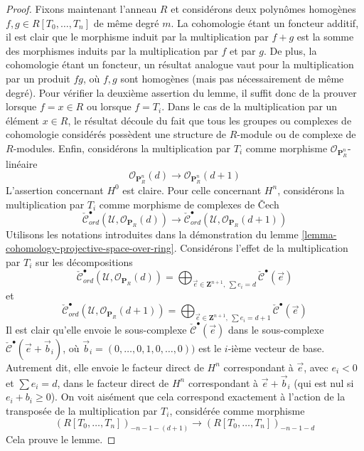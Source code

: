 \begin{proof}
\medskip\noindent
Fixons maintenant l'anneau $R$ et considérons deux polynômes homogènes
$f, g \in R[T_0, \ldots, T_n]$ de même degré $m$.
La cohomologie étant un foncteur additif, il est clair que le morphisme
induit par la multiplication par $f + g$ est la somme des morphismes
induits par la multiplication par $f$ et
par $g$. De plus, la cohomologie étant un foncteur,
un résultat analogue vaut pour la multiplication par un produit $fg$, où
$f, g$ sont homogènes (mais pas nécessairement de même degré). Pour
vérifier la deuxième assertion du lemme, il suffit donc de
la prouver lorsque $f = x \in R$ ou lorsque $f = T_i$.
Dans le cas de la multiplication par un élément $x \in R$, le
résultat découle du fait que tous les groupes ou complexes de cohomologie considérés
possèdent une structure de $R$-module ou de complexe de $R$-modules.
Enfin, considérons la multiplication par $T_i$
comme morphisme $\mathcal{O}_{\mathbf{P}^n_R}$-linéaire
$$
\mathcal{O}_{\mathbf{P}^n_R}(d)
\longrightarrow
\mathcal{O}_{\mathbf{P}^n_R}(d + 1)
$$
L'assertion concernant $H^0$ est claire. Pour celle concernant $H^n$,
considérons la multiplication par $T_i$ comme morphisme de complexes de {\v C}ech
$$
\check{\mathcal{C}}_{ord}^\bullet(\mathcal{U},
\mathcal{O}_{\mathbf{P}_R}(d))
\longrightarrow
\check{\mathcal{C}}_{ord}^\bullet(\mathcal{U},
\mathcal{O}_{\mathbf{P}_R}(d + 1))
$$
Utilisons les notations introduites dans la démonstration du
lemme \ref{lemma-cohomology-projective-space-over-ring}.
Considérons l'effet de la multiplication par $T_i$
sur les décompositions
$$
\check{\mathcal{C}}_{ord}^\bullet(\mathcal{U}, \mathcal{O}_{\mathbf{P}_R}(d))
=
\bigoplus\nolimits_{\vec{e} \in \mathbf{Z}^{n + 1}, \ \sum e_i = d}
\check{\mathcal{C}}^\bullet(\vec{e})
$$
et
$$
\check{\mathcal{C}}_{ord}^\bullet(\mathcal{U},
\mathcal{O}_{\mathbf{P}_R}(d + 1))
=
\bigoplus\nolimits_{\vec{e} \in \mathbf{Z}^{n + 1}, \ \sum e_i = d + 1}
\check{\mathcal{C}}^\bullet(\vec{e})
$$
Il est clair qu'elle envoie le sous-complexe
$\check{\mathcal{C}}^\bullet(\vec{e})$ dans le sous-complexe
$\check{\mathcal{C}}^\bullet(\vec{e} + \vec{b}_i)$, où
$\vec{b}_i = (0, \ldots, 0, 1, 0, \ldots, 0))$ est le $i$-ième vecteur de
base. Autrement dit, elle envoie le facteur direct de $H^n$ correspondant à
$\vec{e}$, avec $e_i < 0$ et $\sum e_i = d$,
dans le facteur direct de $H^n$ correspondant à
$\vec{e} + \vec{b}_i$ (qui est nul si $e_i + b_i \geq 0$).
On voit aisément que cela correspond exactement à l'action de la
transposée de la multiplication par $T_i$, considérée comme morphisme
$$
(R[T_0, \ldots, T_n])_{-n - 1 - (d + 1)}
\longrightarrow
(R[T_0, \ldots, T_n])_{-n - 1 - d}
$$
Cela prouve le lemme.
\end{proof}


